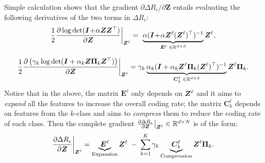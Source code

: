 \documentclass[../../book-main.tex]{subfiles}
\begin{document}
Simple calculation shows that the gradient ${\partial \Delta R_{\epsilon}}/{\partial \bm Z}$ entails evaluating the following derivatives of the two terms in $\Delta R_{\epsilon}$:
\begin{equation}\label{eqn:expand-directions}
    \frac{1}{2}\frac{\partial \log \det (\bm{I} \!+\! \alpha \bm{Z} \bm{Z}^{\top} )}{\partial \bm Z}\bigg|_{\bm{Z}^\ell} = \,\, \underbrace{\alpha(\bm{I} \!+\! \alpha\bm{Z}^\ell (\bm{Z}^\ell)^\top)^{-1}}_{\bm E^{\ell} \; \in \mathbb{R}^{d\times d}}\bm{Z}^\ell,
\end{equation}

\begin{equation}\label{eqn:compress-directions}
\frac{1}{2}\frac{\partial \left( \gamma_{k}  \log \det (\bm{I} + \alpha_{k} \bm{Z} \bm \Pi_k \bm{Z}^{\top} )  \right)}{\partial \bm Z}\bigg|_{\bm{Z}^\ell} \\= \gamma_{k}  \underbrace{ \alpha_{k}  (\bm{I} +  \alpha_{k} \bm{Z}^\ell \bm \Pi_k (\bm{Z}^\ell)^{\top})^{-1}}_{\bm C^{\ell}_k \; \in \mathbb{R}^{d\times d}} \bm{Z}^{\ell} \bm \Pi_k.
\end{equation}
Notice that in the above, the matrix $\bm E^{\ell}$  only depends on $\bm{Z}^{\ell}$ and it aims to {\em expand} all the features to increase the overall coding rate; the matrix $\bm C^{\ell}_{k}$ depends on features from the $k$-class and aims to {\em compress} them to reduce the coding rate of each class. 
Then the complete gradient $\frac{\partial \Delta R_{\epsilon}}{\partial \bm Z}\big|_{\bm{Z}^\ell} \in \mathbb{R}^{d\times N}$ is of the  form:
\begin{equation}
\frac{\partial \Delta R_{\epsilon}}{\partial \bm Z}\bigg|_{\bm{Z}^\ell}  = \underbrace{\bm E^{\ell}}_{\text{Expansion}} \bm{Z}^{\ell} \;-\; \sum_{k=1}^K \gamma_{k} \underbrace{\bm C_{k}^{\ell}}_{\text{Compression}}  \bm{Z}^{\ell} \bm{\Pi}_k.
\label{eqn:DR-gradient}
\end{equation}
\end{document}
